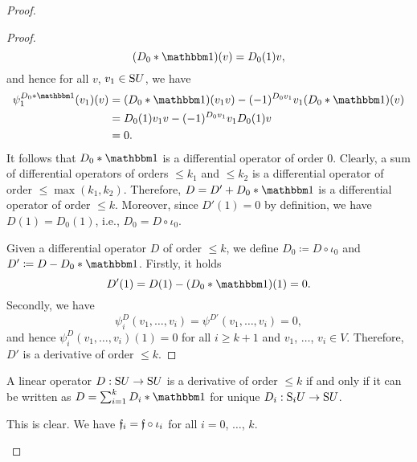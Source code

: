 \documentclass[\MainFolder/Text.tex]{subfiles}
\begin{document}
\begin{proof}
\begin{ProofList}
\begin{proof}
$$ (D_0\Star\Id)(v) = D_0(1)v,$$
and hence for all $v$, $v_1\in \mathrm{S} U$, we have
\begin{align*}
\psi^{D_0\Star \Id}_1(v_1)(v) &= (D_0\Star \Id)(v_1 v) - (-1)^{D_0 v_1} v_1 (D_0\Star \Id)(v) \\
& = D_0(1)v_1 v - (-1)^{D_0 v_1} v_1 D_0(1) v \\
& = 0.
\end{align*}
It follows that $D_0 \Star \Id$ is a differential operator of order $0$. Clearly, a sum of differential operators of orders $\le k_1$ and $\le k_2$ is a differential operator of order $\le \max(k_1,k_2)$. Therefore, $D = D' + D_0\Star\Id$ is a differential operator of order $\le k$. Moreover, since $D'(1) = 0$ by definition, we have $D(1) = D_0(1)$, i.e., $D_0 = D \circ \iota_0$.

Given a differential operator $D$ of order $\le k$, we define $D_0\coloneqq D\circ\iota_0$ and $D'\coloneqq D - D_0\Star\Id$. Firstly, it holds 
$$ D'(1) = D(1) - (D_0\Star \Id)(1) = 0. $$
Secondly, we have 
$$ \psi_i^D(v_1,\dotsc,v_i) = \psi^{D'}(v_1,\dotsc,v_i) = 0, $$
and hence $\psi_i^D(v_1,\dotsc,v_i)(1) = 0$ for all $i\ge k+1$ and $v_1$, $\dotsc$, $v_i\in V$. Therefore, $D'$ is a derivative of order $\le k$.
\renewcommand{\qed}{\hfill\textit{(Subclaim) }$\square$}
\end{proof}
\begin{ProofProposition}\label{ProofProp:Filtr}
A linear operator $D: \mathrm{S} U \rightarrow \mathrm{S} U$ is a derivative of order $\le k$ if and only if it can be written as $D = \sum_{i=1}^k D_i \Star \Id$ for unique $D_i : \mathrm{S}_i U \rightarrow \mathrm{S} U$. 
\end{ProofProposition}
\item This is clear. We have $\mathfrak{f}_i = \mathfrak{f} \circ \iota_i$ for all $i=0$, $\dotsc$, $k$. \qedhere
\end{ProofList}
\end{proof}


\end{document}
